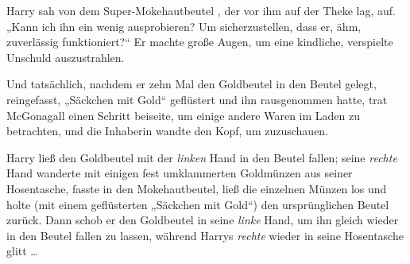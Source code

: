 Harry sah von dem Super-Mokehautbeutel , der vor ihm auf der Theke lag, auf.
„Kann ich ihn ein wenig ausprobieren? Um sicherzustellen, dass er, ähm, zuverlässig funktioniert?“ Er machte große Augen, um eine kindliche, verspielte Unschuld auszustrahlen.

Und tatsächlich, nachdem er zehn Mal den Goldbeutel in den Beutel gelegt, reingefasst,
„Säckchen mit Gold“ geflüstert und ihn rausgenommen hatte, trat McGonagall einen Schritt beiseite, um einige andere Waren im Laden zu betrachten, und die Inhaberin wandte den Kopf, um zuzuschauen.

Harry ließ den Goldbeutel mit der \emph{linken} Hand in den Beutel fallen; seine \emph{rechte} Hand wanderte mit einigen fest umklammerten Goldmünzen aus seiner Hosentasche, fasste in den Mokehautbeutel, ließ die einzelnen Münzen los und holte (mit einem geflüsterten
„Säckchen mit Gold“) den ursprünglichen Beutel zurück. Dann schob er den Goldbeutel in seine \emph{linke} Hand, um ihn gleich wieder in den Beutel fallen zu lassen, während Harrys \emph{rechte} wieder in seine Hosentasche glitt …

